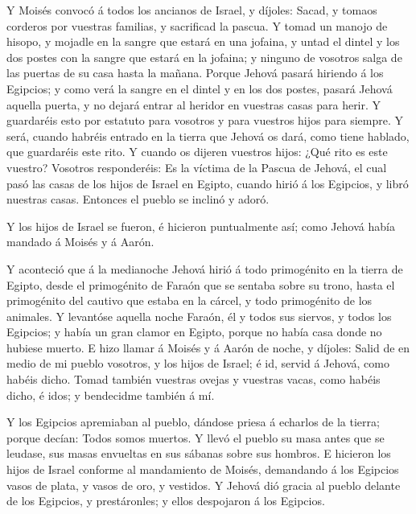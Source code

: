  Y Moisés convocó á todos los ancianos de Israel, y
díjoles: Sacad, y tomaos corderos por vuestras familias, y sacrificad la
pascua.  Y tomad un manojo de hisopo, y mojadle en la
sangre que estará en una jofaina, y untad el dintel y los dos postes con
la sangre que estará en la jofaina; y ninguno de vosotros salga de las
puertas de su casa hasta la mañana.  Porque Jehová pasará
hiriendo á los Egipcios; y como verá la sangre en el dintel y en los dos
postes, pasará Jehová aquella puerta, y no dejará entrar al heridor en
vuestras casas para herir.  Y guardaréis esto por estatuto
para vosotros y para vuestros hijos para siempre.  Y será,
cuando habréis entrado en la tierra que Jehová os dará, como tiene
hablado, que guardaréis este rito.  Y cuando os dijeren
vuestros hijos: ¿Qué rito es este vuestro?  Vosotros
responderéis: Es la víctima de la Pascua de Jehová, el cual pasó las
casas de los hijos de Israel en Egipto, cuando hirió á los Egipcios, y
libró nuestras casas. Entonces el pueblo se inclinó y adoró.

 Y los hijos de Israel se fueron, é hicieron puntualmente
así; como Jehová había mandado á Moisés y á Aarón.

 Y aconteció que á la medianoche Jehová hirió á todo
primogénito en la tierra de Egipto, desde el primogénito de Faraón que
se sentaba sobre su trono, hasta el primogénito del cautivo que estaba
en la cárcel, y todo primogénito de los animales.  Y
levantóse aquella noche Faraón, él y todos sus siervos, y todos los
Egipcios; y había un gran clamor en Egipto, porque no había casa donde
no hubiese muerto.  E hizo llamar á Moisés y á Aarón de
noche, y díjoles: Salid de en medio de mi pueblo vosotros, y los hijos
de Israel; é id, servid á Jehová, como habéis dicho.  Tomad
también vuestras ovejas y vuestras vacas, como habéis dicho, é idos; y
bendecidme también á mí.

 Y los Egipcios apremiaban al pueblo, dándose priesa á
echarlos de la tierra; porque decían: Todos somos muertos. 
Y llevó el pueblo su masa antes que se leudase, sus masas envueltas en
sus sábanas sobre sus hombros.  E hicieron los hijos de
Israel conforme al mandamiento de Moisés, demandando á los Egipcios
vasos de plata, y vasos de oro, y vestidos.  Y Jehová dió
gracia al pueblo delante de los Egipcios, y prestáronles; y ellos
despojaron á los Egipcios.

